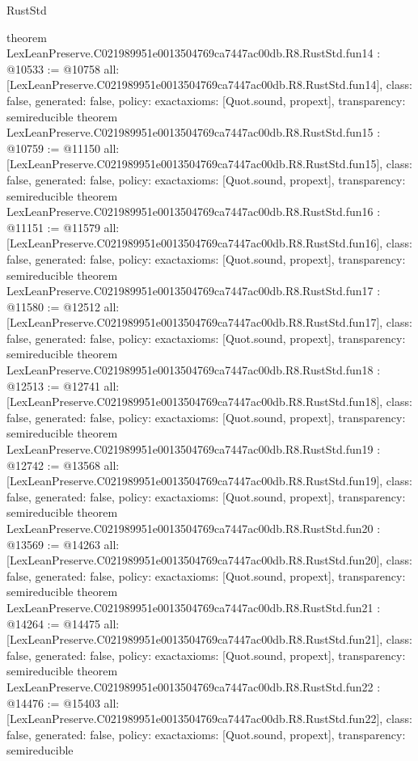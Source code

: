 \begin{lexlean}{RustStd}
\begin{coremodule}
{}
theorem LexLeanPreserve.C021989951e0013504769ca7447ac00db.R8.RustStd.fun14 : @10533 := @10758 {
  all: [LexLeanPreserve.C021989951e0013504769ca7447ac00db.R8.RustStd.fun14],
  class: false,
  generated: false,
  policy: exact{axioms: [Quot.sound, propext]},
  transparency: semireducible
}
theorem LexLeanPreserve.C021989951e0013504769ca7447ac00db.R8.RustStd.fun15 : @10759 := @11150 {
  all: [LexLeanPreserve.C021989951e0013504769ca7447ac00db.R8.RustStd.fun15],
  class: false,
  generated: false,
  policy: exact{axioms: [Quot.sound, propext]},
  transparency: semireducible
}
theorem LexLeanPreserve.C021989951e0013504769ca7447ac00db.R8.RustStd.fun16 : @11151 := @11579 {
  all: [LexLeanPreserve.C021989951e0013504769ca7447ac00db.R8.RustStd.fun16],
  class: false,
  generated: false,
  policy: exact{axioms: [Quot.sound, propext]},
  transparency: semireducible
}
theorem LexLeanPreserve.C021989951e0013504769ca7447ac00db.R8.RustStd.fun17 : @11580 := @12512 {
  all: [LexLeanPreserve.C021989951e0013504769ca7447ac00db.R8.RustStd.fun17],
  class: false,
  generated: false,
  policy: exact{axioms: [Quot.sound, propext]},
  transparency: semireducible
}
theorem LexLeanPreserve.C021989951e0013504769ca7447ac00db.R8.RustStd.fun18 : @12513 := @12741 {
  all: [LexLeanPreserve.C021989951e0013504769ca7447ac00db.R8.RustStd.fun18],
  class: false,
  generated: false,
  policy: exact{axioms: [Quot.sound, propext]},
  transparency: semireducible
}
theorem LexLeanPreserve.C021989951e0013504769ca7447ac00db.R8.RustStd.fun19 : @12742 := @13568 {
  all: [LexLeanPreserve.C021989951e0013504769ca7447ac00db.R8.RustStd.fun19],
  class: false,
  generated: false,
  policy: exact{axioms: [Quot.sound, propext]},
  transparency: semireducible
}
theorem LexLeanPreserve.C021989951e0013504769ca7447ac00db.R8.RustStd.fun20 : @13569 := @14263 {
  all: [LexLeanPreserve.C021989951e0013504769ca7447ac00db.R8.RustStd.fun20],
  class: false,
  generated: false,
  policy: exact{axioms: [Quot.sound, propext]},
  transparency: semireducible
}
theorem LexLeanPreserve.C021989951e0013504769ca7447ac00db.R8.RustStd.fun21 : @14264 := @14475 {
  all: [LexLeanPreserve.C021989951e0013504769ca7447ac00db.R8.RustStd.fun21],
  class: false,
  generated: false,
  policy: exact{axioms: [Quot.sound, propext]},
  transparency: semireducible
}
theorem LexLeanPreserve.C021989951e0013504769ca7447ac00db.R8.RustStd.fun22 : @14476 := @15403 {
  all: [LexLeanPreserve.C021989951e0013504769ca7447ac00db.R8.RustStd.fun22],
  class: false,
  generated: false,
  policy: exact{axioms: [Quot.sound, propext]},
  transparency: semireducible
}
\end{coremodule}
\end{lexlean}
